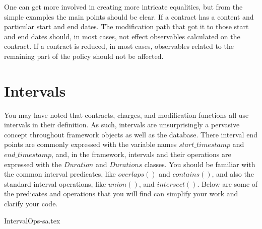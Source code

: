 One can get more involved in creating more intricate equalities, but from the simple examples the main points should be clear.
If a contract has a content and particular start and end dates. The modification path that got it to those start and end dates
should, in most cases, not effect observables calculated on the contract. If a contract is reduced, in most cases, observables related to the
remaining part of the policy should not be affected.


\section{Intervals}
\label{sec:01:5}
You may have noted that contracts, charges, and modification functions all use intervals in their definition. As such, intervals are unsurprisingly
a pervasive concept throughout framework objects as well as the database. There interval end points are commonly expressed with the
variable names $start\_timestamp$ and $end\_timestamp$, and, in the framework, intervals and their operations are expressed with the $Duration$
and $Durations$ classes. You should be familiar with the common interval predicates, like $overlaps()$ and $contains()$, and also the
standard interval operations, like $union()$, and $intersect()$. Below are some of the predicates and operations that you will find
can simplify your work and clarify your code.

{IntervalOps-sa.tex}
